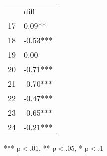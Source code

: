 \documentclass{article}
\begin{document}
\begin{table}[!h]
\centering
\begin{tabular}{ll}
\cline{1-2}
\multicolumn{1}{|l}{} &
  \multicolumn{1}{|l|}{diff} \\
\cline{1-2}
\multicolumn{1}{|l}{17} &
  \multicolumn{1}{|l|}{0.09**} \\
\cline{1-2}
\multicolumn{1}{|l}{18} &
  \multicolumn{1}{|l|}{-0.53***} \\
\cline{1-2}
\multicolumn{1}{|l}{19} &
  \multicolumn{1}{|l|}{0.00} \\
\cline{1-2}
\multicolumn{1}{|l}{20} &
  \multicolumn{1}{|l|}{-0.71***} \\
\cline{1-2}
\multicolumn{1}{|l}{21} &
  \multicolumn{1}{|l|}{-0.70***} \\
\cline{1-2}
\multicolumn{1}{|l}{22} &
  \multicolumn{1}{|l|}{-0.47***} \\
\cline{1-2}
\multicolumn{1}{|l}{23} &
  \multicolumn{1}{|l|}{-0.65***} \\
\cline{1-2}
\multicolumn{1}{|l}{24} &
  \multicolumn{1}{|l|}{-0.21***} \\
\cline{1-2}
\end{tabular}

\footnotesize{
*** p$<$.01, ** p$<$.05, * p$<$.1
}
\end{table}
\end{document}

